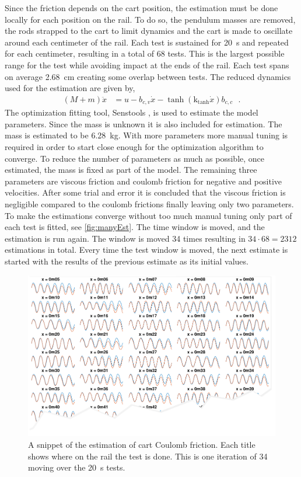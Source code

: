 Since the friction depends on the cart position, the estimation must be done locally for each position on the rail. To do so, the pendulum masses are removed, the rods strapped to the cart to limit dynamics and the cart is made to oscillate around each centimeter of the rail. Each test is sustained for \SI{20}{s} and repeated for each centimeter, resulting in a total of 68 tests. This is the largest possible range for the test while avoiding impact at the ends of the rail. Each test spans on average \SI{2.68}{cm} creating some overlap between tests. The reduced dynamics used for the estimation are given by,
\begin{align}
  ( M + m )\ddot{x} &=  u - b_{c,v} \dot{x} - \tanh(\text{k}_\text{tanh}\dot{x}) b_{c,c} \ \ \ .
  \label{eq:reducedForCartEstimation}
\end{align}
%
The optimization fitting tool, Senstools \cite{MHKnudsen}, is used to estimate the model parameters. Since the mass is unknown it is also included for estimation. The mass is estimated to be \SI{6.28}{kg}. With more parameters more manual tuning is required in order to start close enough for the optimization algorithm to converge. To reduce the number of parameters as much as possible, once estimated, the mass is fixed as part of the model. The remaining three parameters are viscous friction and coulomb friction for negative and positive velocities. After some trial and error it is concluded that the viscous friction is negligible compared to the coulomb frictions finally leaving only two parameters.\\
To make the estimations converge without too much manual tuning only part of each test is fitted, see \autoref{fig:manyEst}. The time window is moved, and the estimation is run again. The window is moved \num{34} times resulting in $34\cdot68 = 2312$ estimations in total. Every time the test window is moved, the next estimate is started with the results of the previous estimate as its initial values.
%
\begin{figure}[H]
  \includegraphics[width=.6\textwidth]{figures/manyEst_tear}
  \caption{A snippet of the estimation of cart Coulomb friction. Each title shows where on the rail the test is done. This is one iteration of 34 moving over the \SI{20}{s} tests.}
  \label{fig:manyEst}
\end{figure}
